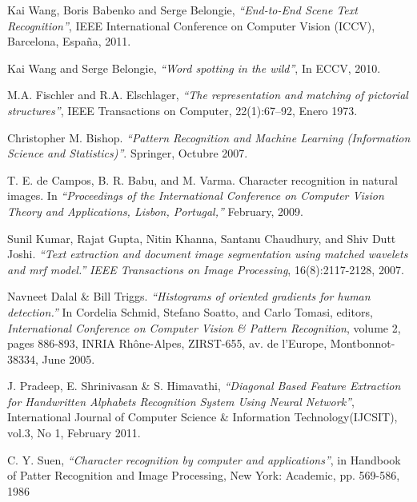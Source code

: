 \newpage	
{}		%

\begin{thebibliography}{100}

 	 	Kai Wang, Boris Babenko and Serge Belongie,
	 	\emph{``End-to-End Scene Text Recognition''},
		IEEE International Conference on Computer Vision (ICCV), 
		Barcelona, España,
		2011.
		
 	 	Kai Wang and Serge Belongie,
	 	\emph{``Word spotting in the wild''},
		In ECCV, 2010.
		
 	 	M.A. Fischler and R.A. Elschlager,
	 	\emph{``The representation and matching of pictorial
structures''},
		IEEE Transactions on Computer, 
		22(1):67–92,
		Enero 1973.
		
		Christopher M. Bishop.
		\emph{``Pattern Recognition and Machine Learning (Information Science and Statistics)''}.
		Springer, Octubre 2007.
		
		T. E. de Campos, B. R. Babu, and M. Varma.
		Character recognition in natural images.
		In \emph{``Proceedings of the International Conference on Computer Vision Theory and Applications, Lisbon, Portugal,''}
		February, 2009.
		
		Sunil Kumar, Rajat Gupta, Nitin Khanna, Santanu Chaudhury, and Shiv Dutt Joshi.
		\emph{``Text extraction and document image segmentation using matched wavelets and mrf model.''}
		\textit{IEEE Transactions on Image Processing}, 16(8):2117-2128, 2007.
	
		Navneet Dalal \& Bill Triggs.
		\emph{``Histograms of oriented gradients for human detection.''}
		In Cordelia Schmid, Stefano Soatto, and Carlo Tomasi, editors, \textit{International Conference on Computer Vision \& Pattern Recognition}, volume 2, pages 886-893, INRIA Rh\^{o}ne-Alpes, ZIRST-655, av. de l'Europe, Montbonnot-38334, June 2005.
		
		J. Pradeep, E. Shrinivasan \& S. Himavathi,
		\emph{``Diagonal Based Feature Extraction for Handwritten Alphabets Recognition System Using Neural Network''},
		International Journal of Computer Science \& Information Technology(IJCSIT),
		vol.3, No 1, February 2011.
		
		C. Y. Suen,
		\emph{``Character recognition by computer and applications''},
		in Handbook of Patter Recognition and Image Processing,
		New York: Academic,
		pp. 569-586,
		1986


\end{thebibliography}

